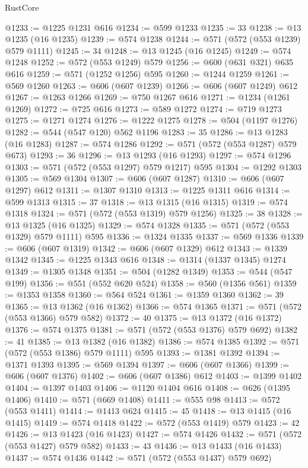 \begin{lexlean}{RustCore}
\begin{coremodule}
@1233 := @1225 @1231 @616
@1234 := @599 @1233
@1235 := 33
@1238 := @13 @1235 (@16 @1235)
@1239 := @574 @1238
@1244 := @571 (@572 (@553 @1239) @579 @1111)
@1245 := 34
@1248 := @13 @1245 (@16 @1245)
@1249 := @574 @1248
@1252 := @572 (@553 @1249) @579
@1256 := @600 (@631 @321) @635 @616
@1259 := @571 (@1252 @1256) @595
@1260 := @1244 @1259
@1261 := @569 @1260
@1263 := @606 (@607 @1239)
@1266 := @606 (@607 @1249) @612
@1267 := @1263 @1266
@1269 := @750 @1267 @616
@1271 := @1234 (@1261 @1269)
@1272 := @725 @616
@1273 := @589 @1272
@1274 := @719 @1273
@1275 := @1271 @1274
@1276 := @1222 @1275
@1278 := @504 (@1197 @1276)
@1282 := @544 (@547 @120) @562 @1196
@1283 := 35
@1286 := @13 @1283 (@16 @1283)
@1287 := @574 @1286
@1292 := @571 (@572 (@553 @1287) @579 @673)
@1293 := 36
@1296 := @13 @1293 (@16 @1293)
@1297 := @574 @1296
@1303 := @571 (@572 (@553 @1297) @579 @1217) @595
@1304 := @1292 @1303
@1305 := @569 @1304
@1307 := @606 (@607 @1287)
@1310 := @606 (@607 @1297) @612
@1311 := @1307 @1310
@1313 := @1225 @1311 @616
@1314 := @599 @1313
@1315 := 37
@1318 := @13 @1315 (@16 @1315)
@1319 := @574 @1318
@1324 := @571 (@572 (@553 @1319) @579 @1256)
@1325 := 38
@1328 := @13 @1325 (@16 @1325)
@1329 := @574 @1328
@1335 := @571 (@572 (@553 @1329) @579 @1111) @595
@1336 := @1324 @1335
@1337 := @569 @1336
@1339 := @606 (@607 @1319)
@1342 := @606 (@607 @1329) @612
@1343 := @1339 @1342
@1345 := @1225 @1343 @616
@1348 := @1314 (@1337 @1345) @1274
@1349 := @1305 @1348
@1351 := @504 (@1282 @1349)
@1353 := @544 (@547 @199)
@1356 := @551 (@552 @620 @524)
@1358 := @560 (@1356 @561)
@1359 := @1353 @1358
@1360 := @564 @524
@1361 := @1359 @1360
@1362 := 39
@1365 := @13 @1362 (@16 @1362)
@1366 := @574 @1365
@1371 := @571 (@572 (@553 @1366) @579 @582)
@1372 := 40
@1375 := @13 @1372 (@16 @1372)
@1376 := @574 @1375
@1381 := @571 (@572 (@553 @1376) @579 @692)
@1382 := 41
@1385 := @13 @1382 (@16 @1382)
@1386 := @574 @1385
@1392 := @571 (@572 (@553 @1386) @579 @1111) @595
@1393 := @1381 @1392
@1394 := @1371 @1393
@1395 := @569 @1394
@1397 := @606 (@607 @1366)
@1399 := @606 (@607 @1376)
@1402 := @606 (@607 @1386) @612
@1403 := @1399 @1402
@1404 := @1397 @1403
@1406 := @1120 @1404 @616
@1408 := @626 (@1395 @1406)
@1410 := @571 (@669 @1408)
@1411 := @555 @98
@1413 := @572 (@553 @1411)
@1414 := @1413 @624
@1415 := 45
@1418 := @13 @1415 (@16 @1415)
@1419 := @574 @1418
@1422 := @572 (@553 @1419) @579
@1423 := 42
@1426 := @13 @1423 (@16 @1423)
@1427 := @574 @1426
@1432 := @571 (@572 (@553 @1427) @579 @582)
@1433 := 43
@1436 := @13 @1433 (@16 @1433)
@1437 := @574 @1436
@1442 := @571 (@572 (@553 @1437) @579 @692)

\end{coremodule}
\end{lexlean}
